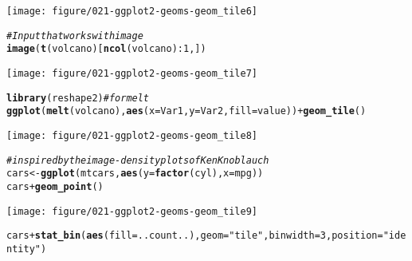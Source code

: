 \documentclass[a4paper,titlepage]{tufte-handout}\usepackage[]{graphicx}\usepackage[]{color}
\makeatletter
\def\maxwidth{ %
  \ifdim\Gin@nat@width>\linewidth
    \linewidth
  \else
    \Gin@nat@width
  \fi
}
\newcommand{\hlnum}[1]{\textcolor[rgb]{0.686,0.059,0.569}{#1}}%
\newcommand{\hlstr}[1]{\textcolor[rgb]{0.192,0.494,0.8}{#1}}%
\newcommand{\hlcom}[1]{\textcolor[rgb]{0.678,0.584,0.686}{\textit{#1}}}%
\newcommand{\hlopt}[1]{\textcolor[rgb]{0,0,0}{#1}}%
\newcommand{\hlstd}[1]{\textcolor[rgb]{0.345,0.345,0.345}{#1}}%
\newcommand{\hlkwb}[1]{\textcolor[rgb]{0.69,0.353,0.396}{#1}}%
\newcommand{\hlkwc}[1]{\textcolor[rgb]{0.333,0.667,0.333}{#1}}%
\newcommand{\hlkwd}[1]{\textcolor[rgb]{0.737,0.353,0.396}{\textbf{#1}}}%
\newenvironment{kframe}{%
 \def\at@end@of@kframe{}%
 \ifinner\ifhmode%
  \def\at@end@of@kframe{\end{minipage}}%
  \begin{minipage}{\columnwidth}%
 \fi\fi%
 \def\FrameCommand##1{\hskip\@totalleftmargin \hskip-\fboxsep
 \colorbox{shadecolor}{##1}\hskip-\fboxsep
     \hskip-\linewidth \hskip-\@totalleftmargin \hskip\columnwidth}%
 \MakeFramed {\advance\hsize-\width
   \@totalleftmargin\z@ \linewidth\hsize
   \@setminipage}}%
 {\par\unskip\endMakeFramed%
 \at@end@of@kframe}
\newenvironment{knitrout}{}{} %
\makeatother
\begin{document}
\begin{knitrout}
\begin{kframe}
\end{kframe}
\texttt{[image: figure/021-ggplot2-geoms-geom\_tile6]} 
\begin{kframe}\begin{alltt}
\hlcom{# Input that works with image}
\hlkwd{image}\hlstd{(}\hlkwd{t}\hlstd{(volcano)[}\hlkwd{ncol}\hlstd{(volcano)}\hlopt{:}\hlnum{1}\hlstd{,])}
\end{alltt}
\end{kframe}
\texttt{[image: figure/021-ggplot2-geoms-geom\_tile7]} 
\begin{kframe}\begin{alltt}
\hlkwd{library}\hlstd{(reshape2)} \hlcom{# for melt}
\hlkwd{ggplot}\hlstd{(}\hlkwd{melt}\hlstd{(volcano),} \hlkwd{aes}\hlstd{(}\hlkwc{x}\hlstd{=Var1,} \hlkwc{y}\hlstd{=Var2,} \hlkwc{fill}\hlstd{=value))} \hlopt{+} \hlkwd{geom_tile}\hlstd{()}
\end{alltt}
\end{kframe}
\texttt{[image: figure/021-ggplot2-geoms-geom\_tile8]} 
\begin{kframe}\begin{alltt}
\hlcom{# inspired by the image-density plots of Ken Knoblauch}
\hlstd{cars} \hlkwb{<-} \hlkwd{ggplot}\hlstd{(mtcars,} \hlkwd{aes}\hlstd{(}\hlkwc{y}\hlstd{=}\hlkwd{factor}\hlstd{(cyl),} \hlkwc{x}\hlstd{=mpg))}
\hlstd{cars} \hlopt{+} \hlkwd{geom_point}\hlstd{()}
\end{alltt}
\end{kframe}
\texttt{[image: figure/021-ggplot2-geoms-geom\_tile9]} 
\begin{kframe}\begin{alltt}
\hlstd{cars} \hlopt{+} \hlkwd{stat_bin}\hlstd{(}\hlkwd{aes}\hlstd{(}\hlkwc{fill}\hlstd{=..count..),} \hlkwc{geom}\hlstd{=}\hlstr{"tile"}\hlstd{,} \hlkwc{binwidth}\hlstd{=}\hlnum{3}\hlstd{,} \hlkwc{position}\hlstd{=}\hlstr{"identity"}\hlstd{)}
\end{alltt}



\end{kframe}
\end{knitrout}
\end{document}
